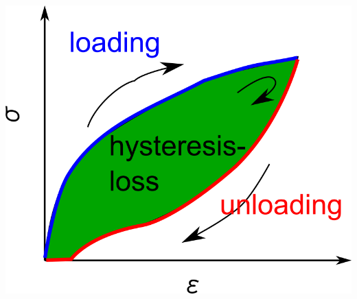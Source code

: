 \documentclass[12pt, dvipdfmx]{beamer}
\begin{document}
\begin{frame}
\begin{columns}[T, onlytextwidth]
\begin{center}
					\includegraphics[width=\textwidth]{hysteresis_curve.png}


\end{center}
\end{columns}
\end{frame}
\end{document}
